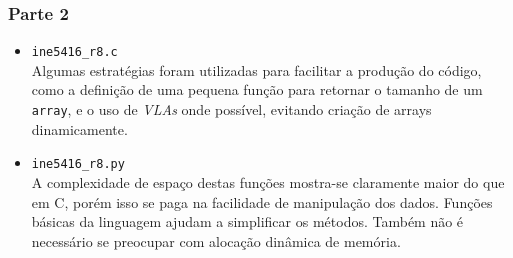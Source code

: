 \documentclass{article}
\begin{document}
\subsubsection*{Parte 2}
\begin{itemize}
    \item \texttt{ine5416\_r8.c} \\
    Algumas estratégias foram utilizadas para facilitar a produção do código,
    como a definição de uma pequena função para retornar o tamanho de um
    \texttt{array}, e o uso de \textit{VLAs} onde possível, evitando criação
    de arrays dinamicamente.
    \item \texttt{ine5416\_r8.py} \\
    A complexidade de espaço destas funções mostra-se claramente maior do que
    em C, porém isso se paga na facilidade de manipulação dos dados. Funções
    básicas da linguagem ajudam a simplificar os métodos. Também não é
    necessário se preocupar com alocação dinâmica de memória.
\end{itemize}
\end{document}
